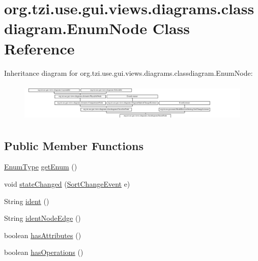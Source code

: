 \hypertarget{classorg_1_1tzi_1_1use_1_1gui_1_1views_1_1diagrams_1_1classdiagram_1_1_enum_node}{\section{org.\-tzi.\-use.\-gui.\-views.\-diagrams.\-classdiagram.\-Enum\-Node Class Reference}
\label{classorg_1_1tzi_1_1use_1_1gui_1_1views_1_1diagrams_1_1classdiagram_1_1_enum_node}
}
Inheritance diagram for org.\-tzi.\-use.\-gui.\-views.\-diagrams.\-classdiagram.\-Enum\-Node\-:\begin{figure}[H]
\begin{center}
\leavevmode
\includegraphics[height=1.866667cm]{classorg_1_1tzi_1_1use_1_1gui_1_1views_1_1diagrams_1_1classdiagram_1_1_enum_node}
\end{center}
\end{figure}
\subsection*{Public Member Functions}
\begin{DoxyCompactItemize}
\item 
\hyperlink{classorg_1_1tzi_1_1use_1_1uml_1_1ocl_1_1type_1_1_enum_type}{Enum\-Type} \hyperlink{classorg_1_1tzi_1_1use_1_1gui_1_1views_1_1diagrams_1_1classdiagram_1_1_enum_node_ad7368bd8dde6f6165f9059801416f546}{get\-Enum} ()
\item 
void \hyperlink{classorg_1_1tzi_1_1use_1_1gui_1_1views_1_1diagrams_1_1classdiagram_1_1_enum_node_aed614f8107a572d3d04d43ce87dbc5d9}{state\-Changed} (\hyperlink{classorg_1_1tzi_1_1use_1_1gui_1_1main_1_1_model_browser_sorting_1_1_sort_change_event}{Sort\-Change\-Event} e)
\item 
String \hyperlink{classorg_1_1tzi_1_1use_1_1gui_1_1views_1_1diagrams_1_1classdiagram_1_1_enum_node_a88650202918ef540a5c618960b419d09}{ident} ()
\item 
String \hyperlink{classorg_1_1tzi_1_1use_1_1gui_1_1views_1_1diagrams_1_1classdiagram_1_1_enum_node_a5ba979c9ef0ca43a925f237b833312b2}{ident\-Node\-Edge} ()
\item 
boolean \hyperlink{classorg_1_1tzi_1_1use_1_1gui_1_1views_1_1diagrams_1_1classdiagram_1_1_enum_node_af498a921b291bd55b828d80a3ae1b4ba}{has\-Attributes} ()
\item 
boolean \hyperlink{classorg_1_1tzi_1_1use_1_1gui_1_1views_1_1diagrams_1_1classdiagram_1_1_enum_node_a0da0be964bd49faf28d1a47d6995fefd}{has\-Operations} ()
\end{DoxyCompactItemize}
